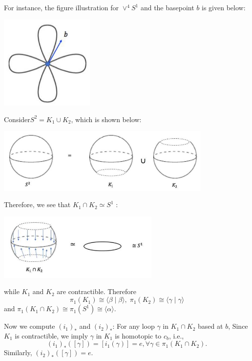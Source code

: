 \begin{example}
For instance, the figure illustration for \({ \vee  }^{4}{S}^{1}\) and the basepoint \(b\) is given below:
\begin{center}
\includegraphics[width=0.35\textwidth]{images/Ch9_4_petals.jpg}
\end{center}
\end{example}

\begin{example}
Consider\({S}^{2} = {K}_{1} \cup  {K}_{2}\), which is shown below:
\begin{center}
\includegraphics[width=0.8\textwidth]{images/Ch9_S2_K1K2.jpg}
\end{center}
Therefore, we see that \({K}_{1} \cap  {K}_{2} \simeq  {S}^{1}\) :
\begin{center}
\includegraphics[width=0.6\textwidth]{images/Ch9_S2_K1capK2_S1.jpg}
\end{center}
while \({K}_{1}\) and \({K}_{2}\) are contractible. Therefore
\[
{\pi }_{1}\left( {K}_{1}\right)  \cong  \langle \beta  \mid  \beta \rangle,\;{\pi }_{1}\left( {K}_{2}\right)  \cong  \langle \gamma  \mid  \gamma \rangle
\]
and 
\({\pi }_{1}\left( {{K}_{1} \cap  {K}_{2}}\right)  \cong  {\pi }_{1}\left( {S}^{1}\right)  \cong  \langle \alpha \rangle\).

Now we compute \({\left( {i}_{1}\right) }_{ * }\) and \({\left( {i}_{2}\right) }_{ * }\): 
For any loop \(\gamma\) in $K_1 \cap K_2$ based at \(b\), Since \({K}_{1}\) is contractible, we imply \(\gamma\) in \({K}_{1}\) is homotopic to \({c}_{b}\), i.e.,
\[
{\left( {i}_{1}\right) }_{ * }\left( \left\lbrack  \gamma \right\rbrack  \right)  = \left\lbrack  {{i}_{1}\left( \gamma \right) }\right\rbrack   = e,\forall \gamma  \in  {\pi }_{1}\left( {{K}_{1} \cap  {K}_{2}}\right).
\]
Similarly, \({\left( {i}_{2}\right) }_{ * }\left( \left\lbrack  \gamma \right\rbrack  \right)  = e\).


\end{example}
